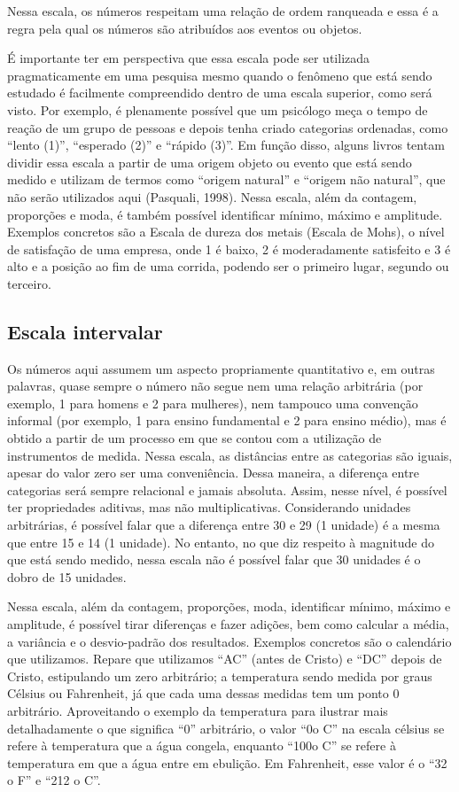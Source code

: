 \documentclass[
]{book}
\begin{document}
Nessa escala, os números respeitam uma relação de ordem ranqueada e essa é a regra pela qual os números são atribuídos aos eventos ou objetos.

É importante ter em perspectiva que essa escala pode ser utilizada pragmaticamente em uma pesquisa mesmo quando o fenômeno que está sendo estudado é facilmente compreendido dentro de uma escala superior, como será visto. Por exemplo, é plenamente possível que um psicólogo meça o tempo de reação de um grupo de pessoas e depois tenha criado categorias ordenadas, como ``lento (1)'', ``esperado (2)'' e ``rápido (3)''. Em função disso, alguns livros tentam dividir essa escala a partir de uma origem objeto ou evento que está sendo medido e utilizam de termos como ``origem natural'' e ``origem não natural'', que não serão utilizados aqui (Pasquali, 1998).
Nessa escala, além da contagem, proporções e moda, é também possível identificar mínimo, máximo e amplitude. Exemplos concretos são a Escala de dureza dos metais (Escala de Mohs), o nível de satisfação de uma empresa, onde 1 é baixo, 2 é moderadamente satisfeito e 3 é alto e a posição ao fim de uma corrida, podendo ser o primeiro lugar, segundo ou terceiro.

\hypertarget{escala-intervalar}{%
\subsection{Escala intervalar}\label{escala-intervalar}}

Os números aqui assumem um aspecto propriamente quantitativo e, em outras palavras, quase sempre o número não segue nem uma relação arbitrária (por exemplo, 1 para homens e 2 para mulheres), nem tampouco uma convenção informal (por exemplo, 1 para ensino fundamental e 2 para ensino médio), mas é obtido a partir de um processo em que se contou com a utilização de instrumentos de medida.
Nessa escala, as distâncias entre as categorias são iguais, apesar do valor zero ser uma conveniência. Dessa maneira, a diferença entre categorias será sempre relacional e jamais absoluta. Assim, nesse nível, é possível ter propriedades aditivas, mas não multiplicativas. Considerando unidades arbitrárias, é possível falar que a diferença entre 30 e 29 (1 unidade) é a mesma que entre 15 e 14 (1 unidade). No entanto, no que diz respeito à magnitude do que está sendo medido, nessa escala não é possível falar que 30 unidades é o dobro de 15 unidades.

Nessa escala, além da contagem, proporções, moda, identificar mínimo, máximo e amplitude, é possível tirar diferenças e fazer adições, bem como calcular a média, a variância e o desvio-padrão dos resultados.
Exemplos concretos são o calendário que utilizamos. Repare que utilizamos ``AC'' (antes de Cristo) e ``DC'' depois de Cristo, estipulando um zero arbitrário; a temperatura sendo medida por graus Célsius ou Fahrenheit, já que cada uma dessas medidas tem um ponto 0 arbitrário. Aproveitando o exemplo da temperatura para ilustrar mais detalhadamente o que significa ``0'' arbitrário, o valor ``0o C'' na escala célsius se refere à temperatura que a água congela, enquanto ``100o C'' se refere à temperatura em que a água entre em ebulição. Em Fahrenheit, esse valor é o ``32 o F'' e ``212 o C''.
\end{document}
